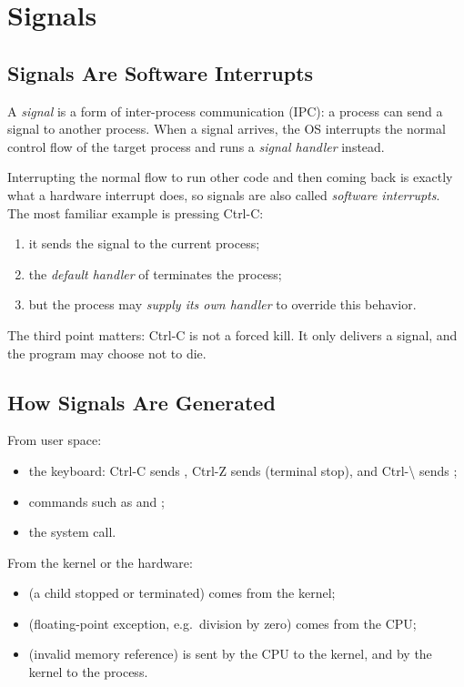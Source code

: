 \section{Signals}
\label{sec:signals}

\subsection{Signals Are Software Interrupts}

\begin{definition}[Signal]
  A \emph{signal} is a form of inter-process communication (IPC): a process can send a signal to another process. When a signal arrives, the OS interrupts the normal control flow of the target process and runs a \emph{signal handler} instead.
\end{definition}

Interrupting the normal flow to run other code and then coming back is exactly what a hardware interrupt does, so signals are also called \emph{software interrupts}. The most familiar example is pressing Ctrl-C:
\begin{enumerate}
  \item it sends the  signal to the current process;
  \item the \emph{default handler} of  terminates the process;
  \item but the process may \emph{supply its own handler} to override this behavior.
\end{enumerate}
The third point matters: Ctrl-C is not a forced kill. It only delivers a signal, and the program may choose not to die.

\subsection{How Signals Are Generated}

From user space:
\begin{itemize}
  \item the keyboard: Ctrl-C sends , Ctrl-Z sends  (terminal stop), and Ctrl-\textbackslash{} sends ;
  \item commands such as  and ;
  \item the  system call.
\end{itemize}
From the kernel or the hardware:
\begin{itemize}
  \item {} (a child stopped or terminated) comes from the kernel;
  \item {} (floating-point exception, e.g.\ division by zero) comes from the CPU;
  \item {} (invalid memory reference) is sent by the CPU to the kernel, and by the kernel to the process.
\end{itemize}

